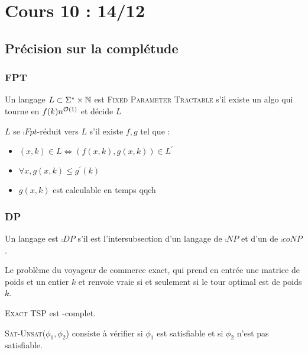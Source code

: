 \documentclass{cours}
\begin{document}
\section[Précisions sur la Complétude]{Cours 10 : 14/12}
\subsection{Précision sur la complétude}
\subsubsection{FPT}
\begin{definition}
    Un langage $L \subset \Sigma^{\star} \times \mathbb{N}$ est \textsc{Fixed Parameter Tractable} s'il existe un algo qui tourne en $f(k)n^{\mathcal{O}(1)}$ et décide $L$
\end{definition}

\begin{definition}
    $L$ se $\comp{Fpt}$-réduit vers $L$ s'il existe $f, g$ tel que : 
    \begin{itemize}
        \item $(x, k) \in L \Leftrightarrow \left(f(x, k), g(x, k)\right) \in L^{'}$
        \item $\forall x, g(x, k) \leq g^{'}(k)$
        \item $g(x, k)$ est calculable en temps qqch
    \end{itemize}
\end{definition}

\subsubsection{DP}
\begin{definition}
    Un langage est $\comp{DP}$ s'il est l'intersubsection d'un langage de $\comp{NP}$ et d'un de $\comp{coNP}$.
\end{definition}

\begin{definition}
    Le problème du voyageur de commerce exact, qui prend en entrée une matrice de poids et un entier $k$ et renvoie vraie si et seulement si le tour optimal est de poids $k$. 
\end{definition}

\begin{proposition}
    \textsc{Exact TSP} est -complet. 
\end{proposition}

\begin{definition}
    \textsc{Sat-Unsat}($\phi_{1}, \phi_{2}$) consiste à vérifier si $\phi_{1}$ est satisfiable et si $\phi_{2}$ n'est pas satisfiable. 
\end{definition}
\end{document}
